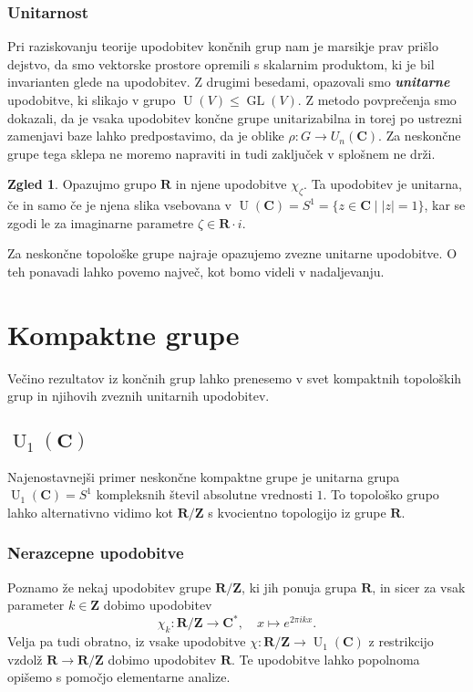 \documentclass[11pt]{book}
\def\ZZ{\mathbf{Z}}
\def\RR{\mathbf{R}}
\def\CC{\mathbf{C}}
\DeclareMathOperator\GL{GL}
\DeclareMathOperator\U{U}
\def\definicija{\color{rdeca}\bf\em}
\theoremstyle{definition}
\theoremstyle{zgled}
\newtheorem*{zgled}{Zgled}
\theoremstyle{odprtproblem}
\theoremstyle{domacanaloga}
\theoremstyle{izrek}
\begin{document}
\subsubsection{Unitarnost}

Pri raziskovanju teorije upodobitev končnih grup nam je marsikje prav prišlo dejstvo, da smo vektorske prostore opremili s skalarnim produktom, ki je bil invarianten glede na upodobitev. Z drugimi besedami, opazovali smo {\definicija unitarne} upodobitve, ki slikajo v grupo $\U(V) \leq \GL(V)$. Z metodo povprečenja smo dokazali, da je vsaka upodobitev končne grupe unitarizabilna in torej po ustrezni zamenjavi baze lahko predpostavimo, da je oblike $\rho \colon G \to U_n(\CC)$. Za neskončne grupe tega sklepa ne moremo napraviti in tudi zaključek v splošnem ne drži.

\begin{zgled}
Opazujmo grupo $\RR$ in njene upodobitve $\chi_{\zeta}$. Ta upodobitev je unitarna, če in samo če je njena slika vsebovana v $\U(\CC) = S^1 = \{ z \in \CC \mid |z| = 1 \}$, kar se zgodi le za imaginarne parametre $\zeta \in \RR \cdot i$.
\end{zgled}

Za neskončne topološke grupe najraje opazujemo zvezne unitarne upodobitve. O teh ponavadi lahko povemo največ, kot bomo videli v nadaljevanju.

\section{Kompaktne grupe}

Večino rezultatov iz končnih grup lahko prenesemo v svet kompaktnih topoloških grup in njihovih zveznih unitarnih upodobitev.

\subsection{$\U_1(\CC)$}

Najenostavnejši primer neskončne kompaktne grupe je unitarna grupa $\U_1(\CC) = S^1$ kompleksnih števil absolutne vrednosti $1$. To topološko grupo lahko alternativno vidimo kot $\RR/\ZZ$ s kvocientno topologijo iz grupe $\RR$. 

\subsubsection{Nerazcepne upodobitve}

Poznamo že nekaj upodobitev grupe $\RR/\ZZ$, ki jih ponuja grupa $\RR$, in sicer za vsak parameter $k \in \ZZ$ dobimo upodobitev
\[
    \chi_k \colon \RR/\ZZ \to \CC^*, \quad
    x \mapsto e^{2 \pi i k x}.
\]
Velja pa tudi obratno, iz vsake upodobitve $\chi \colon \RR/\ZZ \to \U_1(\CC)$ z restrikcijo vzdolž $\RR \to \RR/\ZZ$ dobimo upodobitev $\RR$. Te upodobitve lahko popolnoma opišemo s pomočjo elementarne analize.
\end{document}
